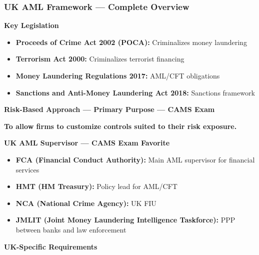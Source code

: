 \documentclass[12pt,aspectratio=169]{beamer}
\renewcommand{\scriptsize}{\fontsize{4.5}{5.5}\selectfont}
\begin{document}
	\begin{frame}
		\frametitle{\fontsize{11}{13}\selectfont \textbf{UK AML Framework — Complete Overview}}
		\begin{block}{\fontsize{7}{9}\selectfont \textbf{Key Legislation}}
			\scriptsize
			\begin{itemize}
				\item \textbf{Proceeds of Crime Act 2002 (POCA):} Criminalizes money laundering
				\item \textbf{Terrorism Act 2000:} Criminalizes terrorist financing
				\item \textbf{Money Laundering Regulations 2017:} AML/CFT obligations
				\item \textbf{Sanctions and Anti-Money Laundering Act 2018:} Sanctions framework
			\end{itemize}
		\end{block}
		\vspace{0.02cm}
		\begin{block}{\fontsize{7}{9}\selectfont \textbf{Risk-Based Approach — Primary Purpose — CAMS Exam}}
			\scriptsize
			\begin{center}
				\textbf{To allow firms to customize controls suited to their risk exposure.}
			\end{center}
		\end{block}
		\vspace{0.02cm}
		\begin{block}{\fontsize{7}{9}\selectfont \textbf{UK AML Supervisor — CAMS Exam Favorite}}
			\scriptsize
			\begin{itemize}
				\item \textbf{FCA (Financial Conduct Authority):} Main AML supervisor for financial services
				\item \textbf{HMT (HM Treasury):} Policy lead for AML/CFT
				\item \textbf{NCA (National Crime Agency):} UK FIU
				\item \textbf{JMLIT (Joint Money Laundering Intelligence Taskforce):} PPP between banks and law enforcement
			\end{itemize}
		\end{block}
		\vspace{0.02cm}
		\begin{block}{\fontsize{7}{9}\selectfont \textbf{UK-Specific Requirements}}

\end{block}
\end{frame}
\end{document}

